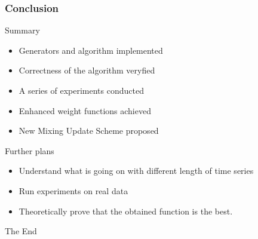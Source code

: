 \documentclass{beamer}
\begin{document}
\begin{frame}
\frametitle{Conclusion}

\begin{block}
    
    Summary
        
    \begin{itemize}
  
        \item Generators and algorithm implemented
        \item Correctness of the algorithm veryfied
        \item A series of experiments conducted
        \item Enhanced weight functions achieved
        \item New Mixing Update Scheme proposed

    \end{itemize}
    \end{block}    
    
    \begin{block}
    
    Further plans
    
    \begin{itemize}
    	\item Understand what is going on with different length of time series
        \item Run experiments on real data 
        \item Theoretically prove that the obtained function is the best.              
    \end{itemize}
    \end{block}

    
\end{frame}


\begin{frame}
\Huge{\centerline{The End}}
\end{frame}
\end{document}
